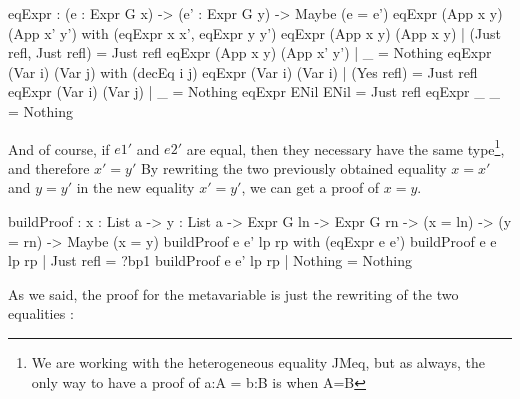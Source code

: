 \documentclass{sigplanconf}
\begin{document}
\begin{code}[caption=Syntactical equality, captionpos=b, label=lst1:haskell2]
  eqExpr : (e : Expr G x) -> (e' : Expr G y) 
  	       -> Maybe (e = e')
  eqExpr (App x y) (App x' y') 
          with (eqExpr x x', eqExpr y y')
    eqExpr (App x y) (App x y)   
    	| (Just refl, Just refl) = Just refl
    eqExpr (App x y) (App x' y') 
    	| _ = Nothing
  eqExpr (Var i) (Var j) with (decEq i j)
    eqExpr (Var i) (Var i) 
    	| (Yes refl) = Just refl
    eqExpr (Var i) (Var j) 
    	| _ = Nothing
  eqExpr ENil ENil = Just refl
  eqExpr _ _ = Nothing
\end{code}


And of course, if $e1'$ and $e2'$ are equal, then they necessary have the same type\footnote{We are working with the heterogeneous equality JMeq, but as always, the only way to have a proof of a:A = b:B is when A=B}, and therefore $x'=y'$
By rewriting the two previously obtained equality $x=x'$ and $y=y'$ in the new equality $x'=y'$, we can get a proof of $x=y$.

\begin{code}[caption=Building the desired proof with the two proofs of equality, captionpos=b, label=lst1:haskell2]
  buildProof : {x : List a} -> {y : List a} 
               -> Expr G ln -> Expr G rn ->
               (x = ln) -> (y = rn) ->
               Maybe (x = y) 
  buildProof e e' lp rp with (eqExpr e e')
    buildProof e e lp rp  | Just refl = ?bp1
    buildProof e e' lp rp | Nothing = Nothing
\end{code}

As we said, the proof for the metavariable is just the rewriting of the two equalities :
\end{document}
